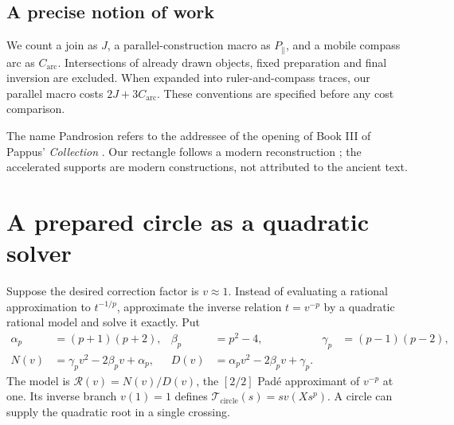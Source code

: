 \documentclass[11pt,a4paper]{article}
\newcommand{\map}[1]{\mathcal T_{\mathrm{#1}}}
\begin{document}
\subsection{A precise notion of work}
We count a join as $J$, a parallel-construction macro as $P_{\parallel}$, and a mobile compass arc as $C_{\mathrm{arc}}$. Intersections of already drawn objects, fixed preparation and final inversion are excluded. When expanded into ruler-and-compass traces, our parallel macro costs $2J+3C_{\mathrm{arc}}$. These conventions are specified before any cost comparison.

The name Pandrosion refers to the addressee of the opening of Book III of Pappus' \emph{Collection} \cite{pappusLittle2023}. Our rectangle follows a modern reconstruction \cite{launayPandrosion}; the accelerated supports are modern constructions, not attributed to the ancient text.

\section{A prepared circle as a quadratic solver}\label{sec:circle}
Suppose the desired correction factor is $v\approx1$. Instead of evaluating a rational approximation to $t^{-1/p}$, approximate the inverse relation $t=v^{-p}$ by a quadratic rational model and solve it exactly. Put
\begin{align}
 \alpha_p&=(p+1)(p+2),&\beta_p&=p^2-4,&\gamma_p&=(p-1)(p-2),\nonumber\\
 N(v)&=\gamma_pv^2-2\beta_pv+\alpha_p,&
 D(v)&=\alpha_pv^2-2\beta_pv+\gamma_p.\label{eq:model}
\end{align}
The model is $\mathcal R(v)=N(v)/D(v)$, the $[2/2]$ Pad\'e approximant of $v^{-p}$ at one. Its inverse branch $v(1)=1$ defines $\map{circle}(s)=sv(Xs^p)$. A circle can supply the quadratic root in a single crossing.
\end{document}
